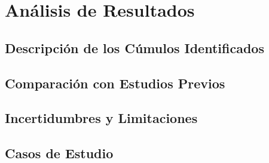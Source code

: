 \documentclass[../Main.tex]{subfiles}
\begin{document}
\section{Análisis de Resultados}

\subsection{Descripción de los Cúmulos Identificados}
\lipsum[1] %

\subsection{Comparación con Estudios Previos}
\lipsum[2] %

\subsection{Incertidumbres y Limitaciones}
\lipsum[3] %

\subsection{Casos de Estudio}
\lipsum[4] %

\biblio 
\end{document}
